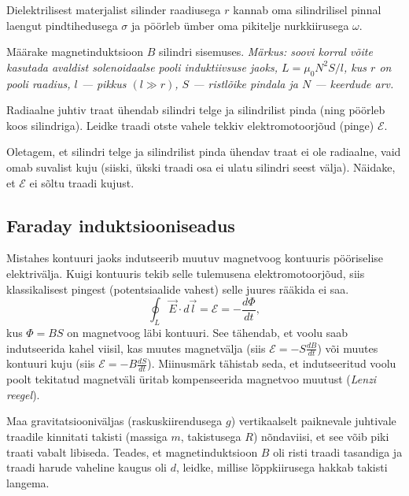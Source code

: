 \documentclass[a4paper,11pt,twocolumn]{article}
\begin{document}
\begin{question}[E-S 2011, P3]
    Dielektrilisest materjalist silinder raadiusega $r$ kannab oma silindrilisel pinnal laengut pindtihedusega $\sigma$ ja pöörleb ümber oma pikitelje nurkkiirusega $\omega$.
    \begin{subquestion}
    \item Määrake magnetinduktsioon $B$ silindri sisemuses. \textit{Märkus: soovi korral võite kasutada avaldist solenoidaalse pooli induktiivsuse jaoks, $L = \mu_0 N^{2}S/l$, kus $r$ on pooli raadius, $l$ — pikkus $(l\gg r)$, $S$ — ristlõike pindala ja $N$ — keerdude arv.}
    \item Radiaalne juhtiv traat ühendab silindri telge ja silindrilist pinda (ning pöörleb koos silindriga). Leidke traadi otste vahele tekkiv elektromotoorjõud (pinge) $\mathcal{E}$.
    \item Oletagem, et silindri telge ja silindrilist pinda ühendav traat ei ole radiaalne, vaid omab suvalist kuju (siiski, ükski traadi osa ei ulatu silindri seest välja). Näidake, et $\mathcal{E}$ ei sõltu traadi kujust.
    \end{subquestion}
\end{question}

\subsection{Faraday induktsiooniseadus}

Mistahes kontuuri jaoks indutseerib muutuv magnetvoog kontuuris pööriselise elektrivälja. Kuigi kontuuris tekib selle tulemusena elektromotoorjõud, siis klassikalisest pingest (potentsiaalide vahest) selle juures rääkida ei saa.
\begin{equation}
    \oint_L \vec{E} \cdot d\vec{l} = \mathcal{E} = -\frac{d\Phi}{dt} \tag{IV Maxwelli võrrand},
\end{equation}
kus $\Phi=BS$ on magnetvoog läbi kontuuri. See tähendab, et voolu saab indutseerida kahel viisil, kas muutes magnetvälja (siis $\mathcal{E}=-S\frac{dB}{dt}$) või muutes kontuuri kuju (siis $\mathcal{E}=-B\frac{dS}{dt}$). Miinusmärk tähistab seda, et indutseeritud voolu poolt tekitatud magnetväli üritab kompenseerida magnetvoo muutust (\textit{Lenzi reegel}).

\begin{question}[Piirk 2011, G8][em3][3cm]
    Maa gravitatsiooniväljas (raskuskiirendusega $g$) vertikaalselt paiknevale juhtivale traadile kinnitati takisti (massiga $m$, takistusega $R$) nõndaviisi, et see võib piki traati vabalt libiseda. Teades, et magnetinduktsioon $B$ oli risti traadi tasandiga ja traadi harude vaheline kaugus oli $d$, leidke, millise lõppkiirusega hakkab takisti langema.
\end{question}
\end{document}

